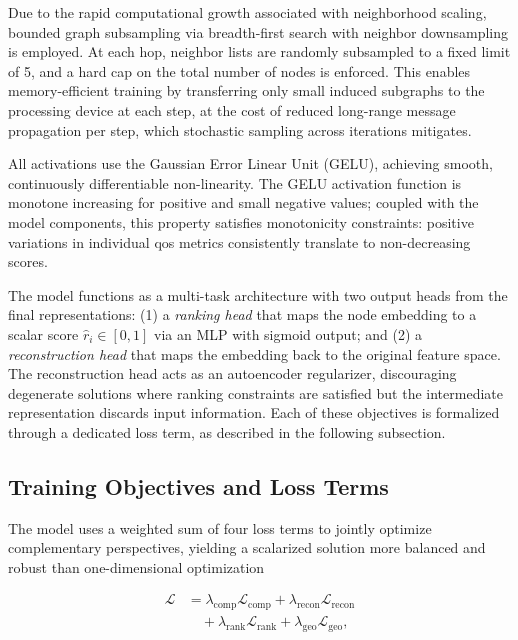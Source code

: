 \documentclass[english]{sbrt}
\begin{document}
Due to the rapid computational growth associated with neighborhood scaling,
bounded graph subsampling via breadth-first search with neighbor downsampling is
employed. At each hop, neighbor lists are randomly subsampled to a fixed limit of 5,
and a hard cap on the total number of nodes is enforced. This enables
memory-efficient training by transferring only small induced subgraphs to the
processing device at each step, at the cost of reduced long-range message
propagation per step, which stochastic sampling across iterations mitigates.

All activations use the Gaussian Error Linear Unit (GELU), achieving smooth,
continuously differentiable non-linearity. The GELU activation function is
monotone increasing for positive and small negative values; coupled with the
model components, this property satisfies monotonicity constraints: positive
variations in individual \gls{qos} metrics consistently translate to
non-decreasing scores.

The model functions as a multi-task architecture with two output heads from the
final representations: (1) a \textit{ranking head} that maps the node embedding
to a scalar score $\hat{r}_i \in [0,1]$ via an MLP with sigmoid output; and (2)
a \textit{reconstruction head} that maps the embedding back to the original
feature space. The reconstruction head acts as an autoencoder regularizer,
discouraging degenerate solutions where ranking constraints are satisfied but
the intermediate representation discards input information. Each of these
objectives is formalized through a dedicated loss term, as described in the
following subsection.

\subsection{Training Objectives and Loss Terms} \label{sec:loss}

The model uses a weighted sum of four loss terms to jointly optimize
complementary perspectives, yielding a scalarized solution more balanced and
robust than one-dimensional optimization

\begin{equation}
  \begin{aligned}
    \mathcal{L} &= \lambda_\mathrm{comp} \mathcal{L}_\mathrm{comp} + \lambda_\mathrm{recon} \mathcal{L}_\mathrm{recon} \\
    &\quad + \lambda_\mathrm{rank} \mathcal{L}_\mathrm{rank} + \lambda_\mathrm{geo} \mathcal{L}_\mathrm{geo},
  \end{aligned}
\end{equation}
\end{document}
